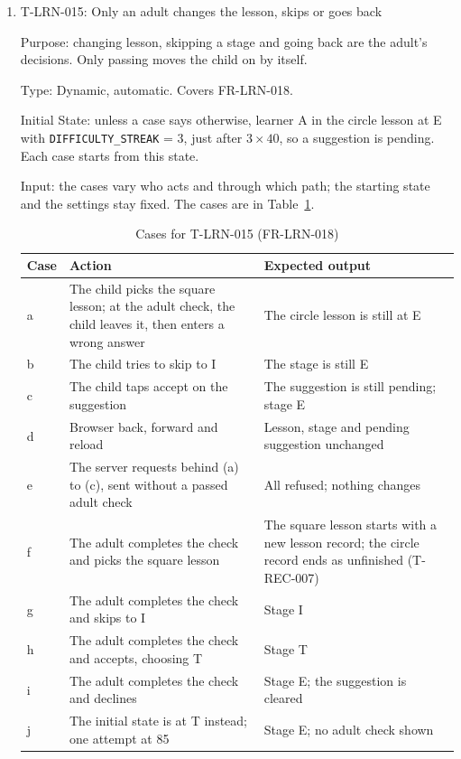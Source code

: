 \documentclass[12pt, titlepage]{article}
\newcommand{\testitem}[1]{\item #1\par\nopagebreak}
\begin{document}
\begin{enumerate}
\testitem{T-LRN-015: Only an adult changes the lesson, skips or goes back}

Purpose: changing lesson, skipping a stage and going back are the adult's
decisions. Only passing moves the child on by itself.

Type: Dynamic, automatic. Covers FR-LRN-018.

Initial State: unless a case says otherwise, learner A in the circle lesson
at E with \texttt{DIFFICULTY\_STREAK} = 3, just after $3 \times 40$, so a
suggestion is pending. Each case starts from this state.

Input: the cases vary who acts and through which path; the starting state
and the settings stay fixed. The cases are in Table~\ref{tab:t-lrn-015}.

\begin{table}[htbp]
\centering\small
\caption{Cases for T-LRN-015 (FR-LRN-018)}
\label{tab:t-lrn-015}
\begin{tabularx}{\textwidth}{@{}l >{\raggedright\arraybackslash}X
  >{\raggedright\arraybackslash}X@{}}
\toprule
\textbf{Case} & \textbf{Action} & \textbf{Expected output}\\
\midrule
a & The child picks the square lesson; at the adult check, the child leaves
it, then enters a wrong answer & The circle lesson is still at E\\
b & The child tries to skip to I & The stage is still E\\
c & The child taps accept on the suggestion & The suggestion is still
pending; stage E\\
d & Browser back, forward and reload & Lesson, stage and pending suggestion
unchanged\\
e & The server requests behind (a) to (c), sent without a passed adult
check & All refused; nothing changes\\
f & The adult completes the check and picks the square lesson & The square
lesson starts with a new lesson record; the circle record ends as
unfinished (T-REC-007)\\
g & The adult completes the check and skips to I & Stage I\\
h & The adult completes the check and accepts, choosing T & Stage T\\
i & The adult completes the check and declines & Stage E; the suggestion is
cleared\\
j & The initial state is at T instead; one attempt at 85 & Stage E; no
adult check shown\\
\bottomrule
\end{tabularx}
\end{table}


\end{enumerate}
\end{document}
